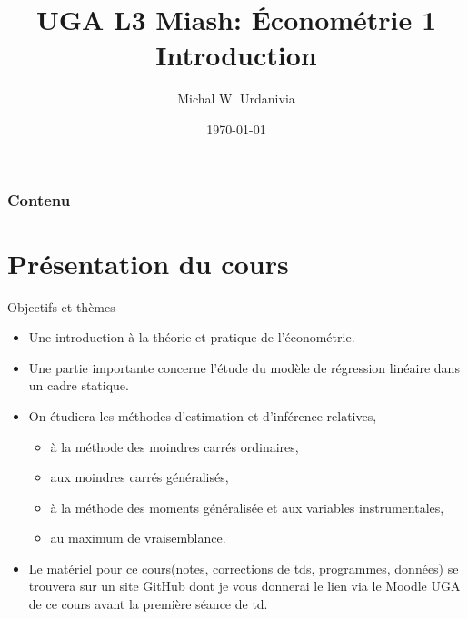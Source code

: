 

\title[\'Econometrie 1: Introduction]{UGA L3 Miash: \'Econométrie 1\\ \textbf{Introduction}}
\date{\today}
\author{Michal W. Urdanivia\inst{*}}




\begin{frame}
\titlepage
\end{frame}

\begin{frame}
\frametitle{Contenu}
\end{frame}

\section{ Présentation du cours}
\frame{\sectionpage}

\begin{frame}[allowframebreaks]{Objectifs et thèmes}
\begin{itemize}
\item Une introduction  à la théorie et pratique de l'économétrie.


\item Une partie importante concerne l'étude du  modèle de régression linéaire dans un cadre statique. 

\item On étudiera  les méthodes d'estimation et d'inférence relatives,

\begin{itemize}
\item à la méthode des moindres carrés ordinaires,
\item  aux moindres carrés généralisés,
\item  à la méthode des moments généralisée et aux variables instrumentales, 
\item au maximum de vraisemblance.
\end{itemize}

\item Le matériel pour ce cours(notes, corrections de tds, programmes,
  données) se trouvera sur un site GitHub dont je vous donnerai
  le lien via le Moodle UGA de ce cours avant la première séance de td.
\end{itemize}
\end{frame}

